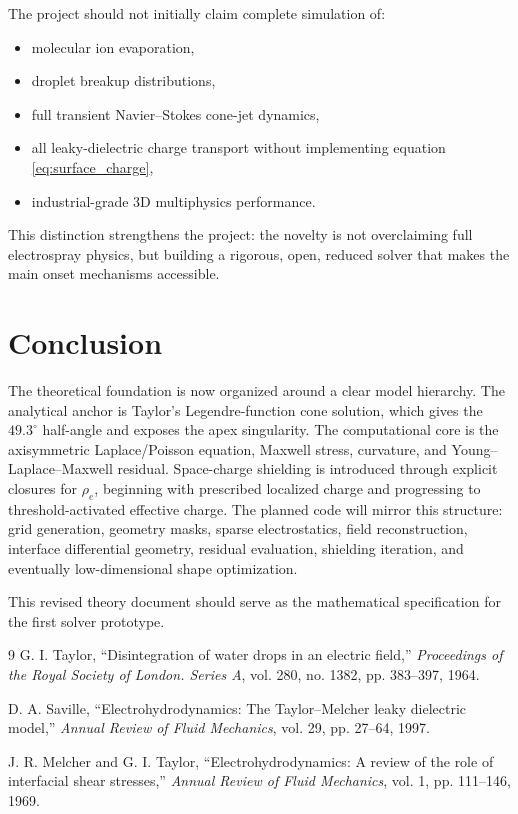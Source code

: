 \documentclass[11pt]{article}
\begin{document}
The project should not initially claim complete simulation of:
\begin{itemize}
    \item molecular ion evaporation,
    \item droplet breakup distributions,
    \item full transient Navier--Stokes cone-jet dynamics,
    \item all leaky-dielectric charge transport without implementing equation \eqref{eq:surface_charge},
    \item industrial-grade 3D multiphysics performance.
\end{itemize}

This distinction strengthens the project: the novelty is not overclaiming full electrospray physics, but building a rigorous, open, reduced solver that makes the main onset mechanisms accessible.

\section{Conclusion}

The theoretical foundation is now organized around a clear model hierarchy. The analytical anchor is Taylor's Legendre-function cone solution, which gives the \(49.3^\circ\) half-angle and exposes the apex singularity. The computational core is the axisymmetric Laplace/Poisson equation, Maxwell stress, curvature, and Young--Laplace--Maxwell residual. Space-charge shielding is introduced through explicit closures for \(\rho_e\), beginning with prescribed localized charge and progressing to threshold-activated effective charge. The planned code will mirror this structure: grid generation, geometry masks, sparse electrostatics, field reconstruction, interface differential geometry, residual evaluation, shielding iteration, and eventually low-dimensional shape optimization.

This revised theory document should serve as the mathematical specification for the first solver prototype.

\begin{thebibliography}{9}
G. I. Taylor, ``Disintegration of water drops in an electric field,'' \emph{Proceedings of the Royal Society of London. Series A}, vol. 280, no. 1382, pp. 383--397, 1964.

D. A. Saville, ``Electrohydrodynamics: The Taylor--Melcher leaky dielectric model,'' \emph{Annual Review of Fluid Mechanics}, vol. 29, pp. 27--64, 1997.

J. R. Melcher and G. I. Taylor, ``Electrohydrodynamics: A review of the role of interfacial shear stresses,'' \emph{Annual Review of Fluid Mechanics}, vol. 1, pp. 111--146, 1969.
\end{thebibliography}
\end{document}

